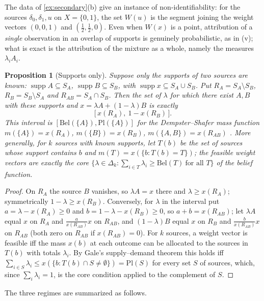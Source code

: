 \documentclass[11pt]{article}
\newtheorem{proposition}[theorem]{Proposition}
\theoremstyle{definition}
\theoremstyle{remark}
\begin{document}
The data of \cref{ex:secondary}(b) give an instance of non-identifiability: for the sources
$\delta_0,\delta_1,u$ on $X=\{0,1\}$, the set $W(u)$ is the segment joining the weight vectors $(0,0,1)$
and $(\tfrac12,\tfrac12,0)$. Even when $W(x)$ is a
point, attribution of a \emph{single} observation in an overlap of supports is genuinely
probabilistic, as in (v); what is exact is the attribution of the mixture as a whole, namely the
measures $\lambda_iA_i$.

\begin{proposition}[Supports only]\label{prop:supports}
Suppose only the supports of two sources are known: $\operatorname{supp}A\subseteq S_A$,
$\operatorname{supp}B\subseteq S_B$, with $\operatorname{supp}x\subseteq S_A\cup S_B$. Put
$R_A=S_A\setminus S_B$, $R_B=S_B\setminus S_A$ and $R_{AB}=S_A\cap S_B$. Then the set of $\lambda$ for
which there exist $A,B$ with these supports and $x=\lambda A+(1-\lambda)B$ is exactly
\[
\big[\,x(R_A),\ 1-x(R_B)\,\big].
\]
This interval is $[\mathrm{Bel}(\{A\}),\mathrm{Pl}(\{A\})]$ for the Dempster--Shafer mass function
$m(\{A\})=x(R_A)$, $m(\{B\})=x(R_B)$, $m(\{A,B\})=x(R_{AB})$ \cite{Dempster1967,Shafer1976}. More
generally, for $k$ sources with known supports, let $T(b)$ be the set of sources whose support
contains $b$ and $m(T)=x(\{b:T(b)=T\})$; the feasible weight vectors are exactly the core
$\{\lambda\in\Delta_k:\sum_{i\in T}\lambda_i\ge\mathrm{Bel}(T)\ \text{for all }T\}$ of the belief
function.
\end{proposition}
\begin{proof}
On $R_A$ the source $B$ vanishes, so $\lambda A=x$ there and $\lambda\ge x(R_A)$; symmetrically
$1-\lambda\ge x(R_B)$. Conversely, for $\lambda$ in the interval put $a=\lambda-x(R_A)\ge0$ and
$b=1-\lambda-x(R_B)\ge0$, so $a+b=x(R_{AB})$; let $\lambda A$ equal $x$ on $R_A$ and
$\tfrac{a}{x(R_{AB})}x$ on $R_{AB}$, and $(1-\lambda)B$ equal $x$ on $R_B$ and $\tfrac{b}{x(R_{AB})}x$ on
$R_{AB}$ (both zero on $R_{AB}$ if $x(R_{AB})=0$). For $k$ sources, a weight vector is feasible iff the
mass $x(b)$ at each outcome can be allocated to the sources in $T(b)$ with totals $\lambda_i$. By
Gale's supply--demand theorem \cite{Gale1957} this holds iff $\sum_{i\in S}\lambda_i\le
x(\{b:T(b)\cap S\ne\emptyset\})=\mathrm{Pl}(S)$ for every set $S$ of sources, which, since
$\sum_i\lambda_i=1$, is the core condition applied to the complement of $S$.
\end{proof}

The three regimes are summarized as follows.
\end{document}
